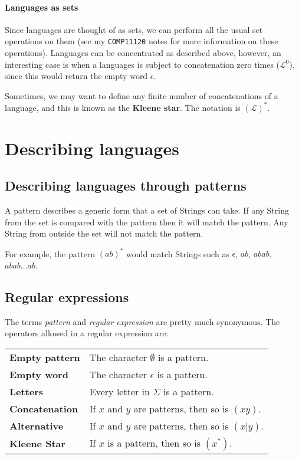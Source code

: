 \paragraph{Languages as sets} Since languages are thought of as sets, we can
perform all the usual set operations on them (see my {\tt COMP11120} notes for
more information on these operations). Languages can be concentrated as
described above, however, an interesting case is when a languages is subject to
concatenation zero times ($\mathcal{L}^0$), since this would return the empty
word $\epsilon$.

Sometimes, we may want to define any finite number of concatenations of a
language, and this is known as the {\bf Kleene star}. The notation is
$(\mathcal{L})^*$.


\section{Describing languages}

\subsection{Describing languages through patterns}

A pattern describes a generic form that a set of Strings can take. If any String
from the set is compared with the pattern then it will match the pattern. Any
String from outside the set will not match the pattern.

For example, the pattern $(ab)^*$ would match Strings such as $\epsilon$, $ab$,
$abab$, $abab \dots ab$.


\subsection{Regular expressions}

The terms {\it pattern} and {\it regular expression} are pretty much synonymous.
The operators allowed in a regular expression are:

\begin{center}
	\begin{tabular}{>{\bfseries} l l}
		Empty pattern & The character $\emptyset$ is a pattern.\\
		Empty word & The character $\epsilon$ is a pattern.\\
		Letters & Every letter in $\Sigma$ is a pattern.\\
		\rowcolor{Gray}
		Concatenation & If $x$ and $y$ are patterns, then so is $(xy)$.\\
		\rowcolor{Gray}
		Alternative & If $x$ and $y$ are patterns, then so is $(x|y)$.\\
		\rowcolor{Gray}
		Kleene Star & If $x$ is a pattern, then so is $(x^*)$.
	\end{tabular}
\end{center}

